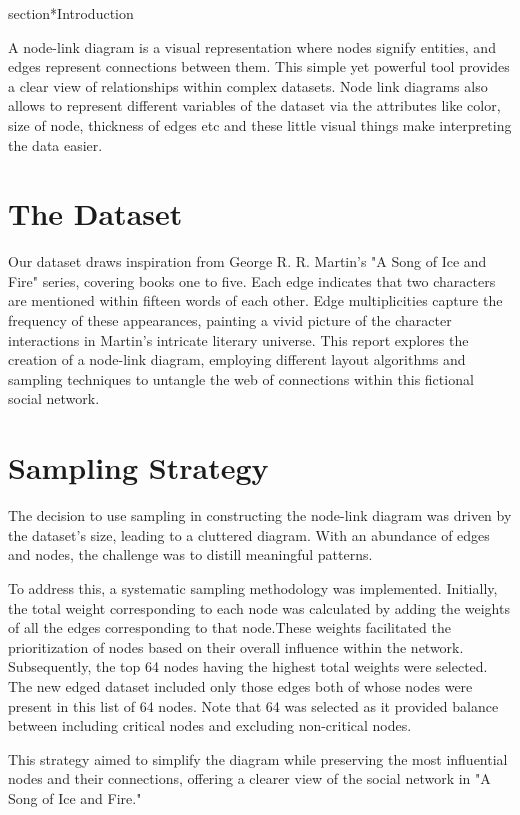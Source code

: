 \documentclass[conference]{IEEEtran}
\begin{document}
section*{Introduction}

A node-link diagram is a visual representation where nodes signify entities, and edges represent connections between them. This simple yet powerful tool provides a clear view of relationships within complex datasets. Node link diagrams also allows to represent different variables of the dataset via the attributes like color, size of node, thickness of edges etc and these little visual things make interpreting the data easier.

\section*{The Dataset}

Our dataset draws inspiration from George R. R. Martin's "A Song of Ice and Fire" series, covering books one to five. Each edge indicates that two characters are mentioned within fifteen words of each other. Edge multiplicities capture the frequency of these appearances, painting a vivid picture of the character interactions in Martin's intricate literary universe. This report explores the creation of a node-link diagram, employing different layout algorithms and sampling techniques to untangle the web of connections within this fictional social network.




\section*{Sampling Strategy}
The decision to use sampling in constructing the node-link diagram was driven by the dataset's size, leading to a cluttered diagram. With an abundance of edges and nodes, the challenge was to distill meaningful patterns.

To address this, a systematic sampling methodology was implemented. Initially, the total weight corresponding to each node was calculated by adding the weights of all the edges corresponding to that node.These weights facilitated the prioritization of nodes based on their overall influence within the network. Subsequently, the top 64 nodes having the highest total weights were selected. The new edged dataset included only those edges both of whose nodes were present in this list of 64 nodes.
Note that 64 was selected as it provided balance between including critical nodes and excluding non-critical nodes.

This strategy aimed to simplify the diagram while preserving the most influential nodes and their connections, offering a clearer view of the social network in "A Song of Ice and Fire."
\end{document}
